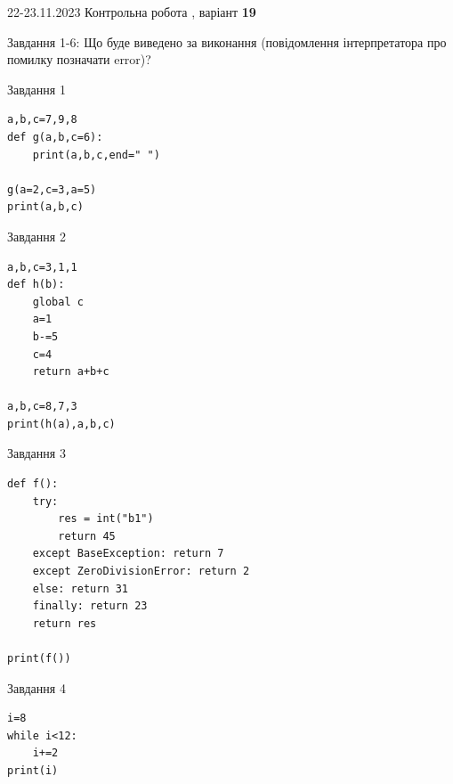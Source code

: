 \documentclass[12pt, ukrainian]{article}
\begin{document}
{{22-23.11.2023 Контрольна робота , варіант  \No \textbf { 19 }\par}}
{

Завдання 1-6: Що буде виведено за виконання (повідомлення інтерпретатора про помилку позначати error)?


\begin{minipage}[t]{9.7cm}                
{\begin{center}Завдання {1}\end{center}}
\begin{verbatim}
a,b,c=7,9,8
def g(a,b,c=6):
    print(a,b,c,end=" ")

g(a=2,c=3,a=5)
print(a,b,c)
\end{verbatim}     
\end{minipage}
\vline \hspace{8mm}
\begin{minipage}[t]{8.0cm}                
{\begin{center}Завдання {2}\end{center}}
\begin{verbatim}
a,b,c=3,1,1
def h(b):
    global c
    a=1
    b-=5
    c=4
    return a+b+c

a,b,c=8,7,3
print(h(a),a,b,c)
\end{verbatim}     
\end{minipage}

\vspace{15mm}
\begin{minipage}[t]{9.7cm}                
{\begin{center}Завдання {3}\end{center}}
\begin{verbatim}
def f():
    try:
        res = int("b1")
        return 45
    except BaseException: return 7
    except ZeroDivisionError: return 2
    else: return 31
    finally: return 23
    return res

print(f())
\end{verbatim}     
\end{minipage}
\vline \hspace{8mm}
\begin{minipage}[t]{8.0cm}                
{\begin{center}Завдання {4}\end{center}}
\begin{verbatim}
i=8
while i<12:
    i+=2
print(i)
\end{verbatim}     
\end{minipage}

}
\end{document}
